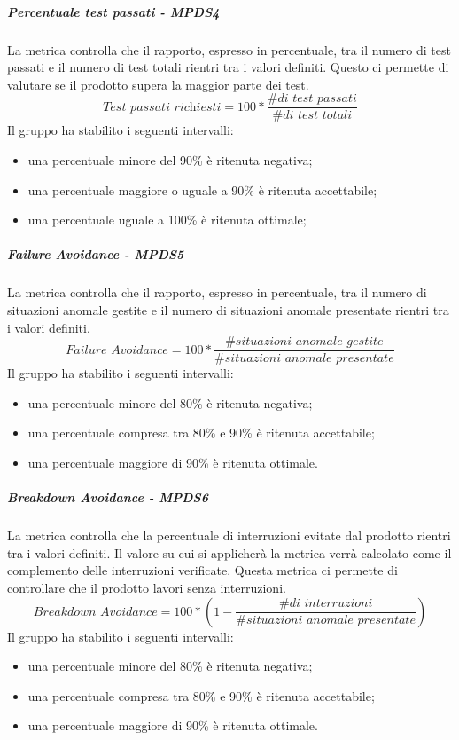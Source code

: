 \documentclass[PianoDiQualifica.tex]{subfiles}
\begin{document}
				
				\hypertarget{test_passati}{\subparagraph{Percentuale test passati  - MPDS4}}
				La metrica controlla che il rapporto, espresso in percentuale, tra il numero di test passati e il numero di test totali rientri tra i valori definiti. Questo ci permette
				di valutare se il prodotto supera la maggior parte dei test. \\
				\begin{equation}\textit{Test passati richiesti} = 100 * \frac{\textit{\# di test passati}}{\textit{\# di test totali}}\end{equation}
				Il gruppo ha stabilito i seguenti intervalli:
				\begin{itemize}
					\item una percentuale minore del 90\% è ritenuta negativa;
					\item una percentuale maggiore o uguale a 90\% è ritenuta accettabile;
					\item una percentuale uguale a 100\% è ritenuta ottimale;
				\end{itemize}
				
				\hypertarget{failure}{\subparagraph{Failure Avoidance - MPDS5}}
				La metrica controlla che il rapporto, espresso in percentuale, tra il numero di situazioni anomale gestite e il numero di situazioni anomale presentate rientri tra i valori definiti.
				\begin{equation}\textit{Failure Avoidance} = 100 * \frac{\textit{\# situazioni anomale gestite}}{\textit{\# situazioni anomale presentate}}\end{equation}
				Il gruppo ha stabilito i seguenti intervalli:
				\begin{itemize}
					\item una percentuale minore del 80\% è ritenuta negativa;
					\item una percentuale compresa tra 80\% e 90\% è ritenuta accettabile;
					\item una percentuale maggiore di 90\% è ritenuta ottimale.
				\end{itemize}
				
				\hypertarget{breakdown}{\subparagraph{Breakdown Avoidance - MPDS6}}
				La metrica controlla che la percentuale di interruzioni evitate dal prodotto rientri tra i valori definiti. Il valore su cui si applicherà la metrica verrà calcolato come il
				complemento delle interruzioni verificate. Questa metrica ci permette di controllare che il prodotto lavori senza interruzioni.
				\begin{equation}\textit{Breakdown Avoidance} = 100 * \left ( 1 - \frac{\textit{\# di interruzioni}}{\textit{\# situazioni anomale presentate}} \right ) \end{equation}
				Il gruppo ha stabilito i seguenti intervalli:
				\begin{itemize}
					\item una percentuale minore del 80\% è ritenuta negativa;
					\item una percentuale compresa tra 80\% e 90\% è ritenuta accettabile;
					\item una percentuale maggiore di 90\% è ritenuta ottimale.
				\end{itemize}
				
\end{document}

